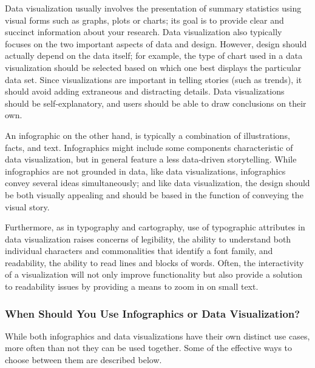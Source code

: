 \documentclass[]{book}
\begin{document}
Data visualization usually involves the presentation of summary statistics using visual forms such as graphs, plots or charts; its goal is to provide clear and succinct information about your research. Data visualization also typically focuses on the two important aspects of data and design. However, design should actually depend on the data itself; for example, the type of chart used in a data visualization should be selected based on which one best displays the particular data set. Since visualizations are important in telling stories (such as trends), it should avoid adding extraneous and distracting details. Data visualizations should be self-explanatory, and users should be able to draw conclusions on their own.

An infographic on the other hand, is typically a combination of illustrations, facts, and text. Infographics might include some components characteristic of data visualization, but in general feature a less data-driven storytelling. While infographics are not grounded in data, like data visualizations, infographics convey several ideas simultaneously; and like data visualization, the design should be both visually appealing and should be based in the function of conveying the visual story.

Furthermore, as in typography and cartography, use of typographic attributes in data visualization raises concerns of legibility, the ability to understand both individual characters and commonalities that identify a font family, and readability, the ability to read lines and blocks of words. Often, the interactivity of a visualization will not only improve functionality but also provide a solution to readability issues by providing a means to zoom in on small text.

\hypertarget{when-should-you-use-infographics-or-data-visualization-1}{%
\subsubsection{When Should You Use Infographics or Data Visualization?}\label{when-should-you-use-infographics-or-data-visualization-1}}

While both infographics and data visualizations have their own distinct use cases, more often than not they can be used together. Some of the effective ways to choose between them are described below.
\end{document}
